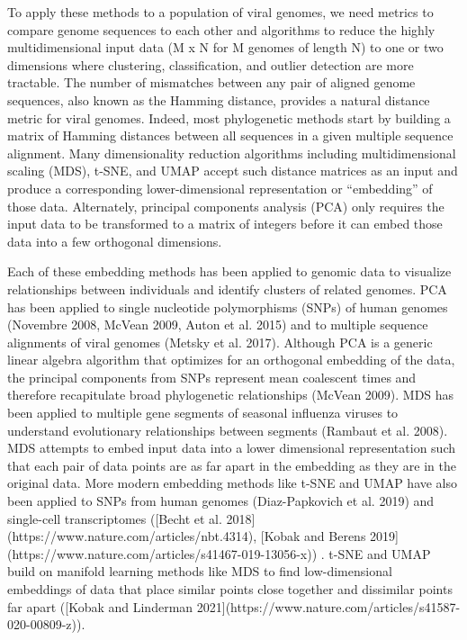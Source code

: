 \documentclass[9pt,lineno]{elife}
\begin{document}
To apply these methods to a population of viral genomes, we need metrics to compare genome sequences to each other and algorithms to reduce the highly multidimensional input data (M x N for M genomes of length N) to one or two dimensions where clustering, classification, and outlier detection are more tractable.
The number of mismatches between any pair of aligned genome sequences, also known as the Hamming distance, provides a natural distance metric for viral genomes.
Indeed, most phylogenetic methods start by building a matrix of Hamming distances between all sequences in a given multiple sequence alignment.
Many dimensionality reduction algorithms including multidimensional scaling (MDS), t-SNE, and UMAP accept such distance matrices as an input and produce a corresponding lower-dimensional representation or “embedding” of those data.
Alternately, principal components analysis (PCA) only requires the input data to be transformed to a matrix of integers before it can embed those data into a few orthogonal dimensions.

Each of these embedding methods has been applied to genomic data to visualize relationships between individuals and identify clusters of related genomes.
PCA has been applied to single nucleotide polymorphisms (SNPs) of human genomes (Novembre 2008, McVean 2009, Auton et al. 2015) and to multiple sequence alignments of viral genomes (Metsky et al. 2017).
Although PCA is a generic linear algebra algorithm that optimizes for an orthogonal embedding of the data, the principal components from SNPs represent mean coalescent times and therefore recapitulate broad phylogenetic relationships (McVean 2009).
MDS has been applied to multiple gene segments of seasonal influenza viruses to understand evolutionary relationships between segments (Rambaut et al. 2008).
MDS attempts to embed input data into a lower dimensional representation such that each pair of data points are as far apart in the embedding as they are in the original data.
More modern embedding methods like t-SNE and UMAP have also been applied to SNPs from human genomes (Diaz-Papkovich et al. 2019) and single-cell transcriptomes ([Becht et al. 2018](https://www.nature.com/articles/nbt.4314), [Kobak and Berens 2019](https://www.nature.com/articles/s41467-019-13056-x)) .
t-SNE and UMAP build on manifold learning methods like MDS to find low-dimensional embeddings of data that place similar points close together and dissimilar points far apart ([Kobak and Linderman 2021](https://www.nature.com/articles/s41587-020-00809-z)).
\end{document}
